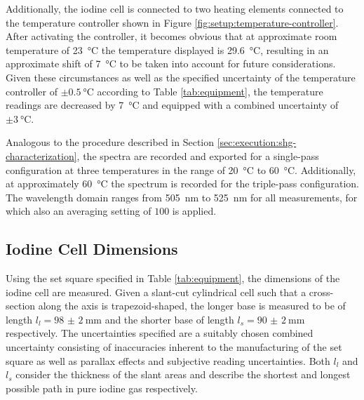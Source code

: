 Additionally, the iodine cell is connected to two heating elements connected to the temperature controller shown in Figure \ref{fig:setup:temperature-controller}. After activating the controller, it becomes obvious that at approximate room temperature of \SI{23}{\celsius} the temperature displayed is \SI{29.6}{\celsius}, resulting in an approximate shift of \SI{7}{\celsius} to be taken into account for future considerations. Given these circumstances as well as the specified uncertainty of the temperature controller of $\pm \SI{0.5}{\celsius}$ according to Table \ref{tab:equipment}, the temperature readings are decreased by \SI{7}{\celsius} and equipped with a combined uncertainty of $\pm \SI{3}{\celsius}$.

Analogous to the procedure described in Section \ref{sec:execution:shg-characterization}, the spectra are recorded and exported for a single-pass configuration at three temperatures in the range of \SI{20}{\celsius} to \SI{60}{\celsius}. Additionally, at approximately \SI{60}{\celsius} the spectrum is recorded for the triple-pass configuration. The wavelength domain ranges from \SI{505}{\nm} to \SI{525}{\nm} for all measurements, for which also an averaging setting of $100$ is applied.

\subsection{Iodine Cell Dimensions}
\label{sec:execution:iodine-cell-dimensions}

Using the set square specified in Table \ref{tab:equipment}, the dimensions of the iodine cell are measured. Given a slant-cut cylindrical cell such that a cross-section along the axis is trapezoid-shaped, the longer base is measured to be of length $l_l = \SI{98(2)}{\mm}$ and the shorter base of length $l_s = \SI{90(2)}{\mm}$ respectively. The uncertainties specified are a suitably chosen combined uncertainty consisting of inaccuracies inherent to the manufacturing of the set square as well as parallax effects and subjective reading uncertainties. Both $l_l$ and $l_s$ consider the thickness of the slant areas and describe the shortest and longest possible path in pure iodine gas respectively.

\newpage